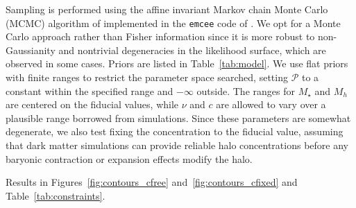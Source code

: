 \documentclass[12pt]{emulateapj}
\begin{document}
Sampling is performed using the
affine invariant Markov chain Monte Carlo (MCMC) algorithm of
\citet{Goodman2010} implemented in the {\tt emcee} code of
\citet{Foreman-Mackey2013}. We opt for a Monte Carlo approach rather
than Fisher information since it is more robust to non-Gaussianity and
nontrivial degeneracies in the likelihood surface, which are observed
in some cases. Priors are listed in Table~\ref{tab:model}. We use flat
priors with finite ranges to restrict the parameter space
searched, setting ${\mathcal P}$ to a constant within the specified
range and $-\infty$ outside. The ranges for $M_{\star}$ and $M_h$ are centered on the
fiducial values, while $\nu$ and $c$ are allowed to vary over a
plausible range borrowed from simulations. Since these parameters are
somewhat degenerate, we also test fixing the concentration to the
fiducial value, assuming that dark matter simulations can provide
reliable halo concentrations before any baryonic contraction or
expansion effects modify the halo.

Results in Figures~\ref{fig:contours_cfree}
and~\ref{fig:contours_cfixed} and Table~\ref{tab:constraints}. 

\begin{figure*}[htb]
\caption{[PLACEHOLDER: FIDUCIAL PARAMETERS AND PRIORS ARE NOT THE
  SAME AS TABLE~\ref{tab:model}] Posterior distributions for model
  parameters from MCMC fit with the fiducial Galaxy model, LSST survey
  parameters, $R_{\rm min}=40\,{\rm kpc}$, and $\Gamma=0.5(?)$. Contraints are from $\Sigma(R)$ (red),
  $\Delta\Sigma(R)$ (green), and the combined data (blue). The top
  column in each panel shows the one-dimensional posterior for each
  parameter while marginalizing over other parameters, and lower
  panels show the $68\%$ and $95\%$ contours for the joint posterior
  for each pair of parameters. $M_{\star}$ and $M_h$ are
  well-constrained (expect $M_{\star}$ with $\Sigma(R)$ only), while
  $c$ and $\nu$ are degenerate and unconstrained by the data.}
\label{fig:contours_cfree}
\end{figure*}

\begin{figure*}[htb]
\caption{Same as Figure~\ref{fig:contours_cfree} but with $c$ fixed to
the fiducial value from simulations. If $c$ is known for the dark
matter halo prior to baryonic contraction or expansion, then $\nu$ can
be constrained.}
\label{fig:contours_cfixed}
\end{figure*}
\end{document}
